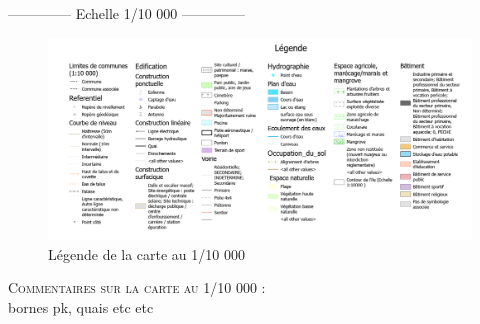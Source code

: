 \documentclass{themeensg}
\begin{document}
\begin{appendices}


\begin{center}
    \Large
    \colorbox{blue!10}{--------------\- Echelle 1/10 000 --------------\-}
\end{center}


\begin{figure}[!h]
\centering
\includegraphics[width=\linewidth]{images/Annexes/Resultat/lengende_10.png}
\caption{Légende de la carte au 1/10 000}
\label{10000_legende}
\end{figure}

\vspace{3cm}
\textsc{Commentaires sur la carte au 1/10 000 :}\\
bornes pk,  quais etc etc


\end{appendices}
\end{document}
